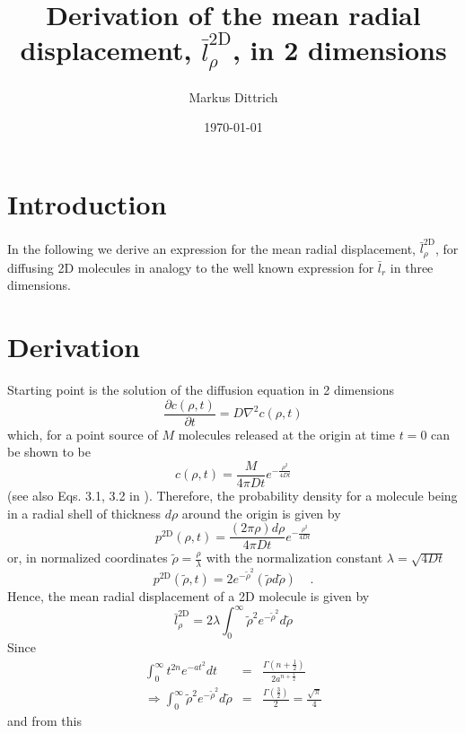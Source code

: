 \documentclass[aps,superscriptaddress,preprint,amsmath,floatfix,byrevtex]{article}
\newcommand{\lrbar}{\bar{l}_{\rho}^{\mathrm{2D}}}
\begin{document}
\title{Derivation of the mean radial displacement, $\lrbar$, in 2 dimensions}
\author{Markus Dittrich}
\date{\today}

\maketitle

\section{Introduction}
In the following we derive an expression for the mean radial displacement, $\lrbar$,
for diffusing 2D molecules in analogy to the well known expression for $\bar{l}_r$
in three dimensions. 


\section{Derivation}
Starting point is the solution of the diffusion equation in 2 dimensions
\begin{equation}
\frac{\partial c(\rho,t)}{\partial t} = D \nabla^2 c(\rho,t)
\end{equation}
which, for a point source of $M$ molecules released at the origin at time $t=0$ 
can be shown to be
\begin{equation}
c(\rho,t) = \frac{M}{4 \pi Dt} e^{- \frac{\rho^2}{4Dt}}
\end{equation}
(see also Eqs. 3.1, 3.2 in \cite{KERR2008}). Therefore, the probability
density for a molecule being in a radial shell of thickness $d\rho$ around the 
origin is given by
\begin{equation}
p^{\mathrm{2D}} (\rho,t) = \frac{(2 \pi \rho) d\rho}{4\pi Dt}  e^{- \frac{\rho^2}{4Dt}} 
\end{equation}          
or, in normalized coordinates $\tilde{\rho} = \frac{\rho}{\lambda}$ with the 
normalization constant $\lambda = \sqrt{4Dt}$
\begin{equation}
p^{\mathrm{2D}} (\tilde{\rho},t) = 2 e^{-\tilde{\rho}^2} (\tilde{\rho} d\tilde{\rho})
  \;\;\;\; .
\end{equation}
Hence, the mean radial displacement of a 2D molecule is given by
\begin{equation}
\lrbar = 2 \lambda \int_0^{\infty}  \tilde{\rho}^2 e^{- \tilde{\rho}^2} d\tilde{\rho}
\end{equation}
Since
\begin{eqnarray}
\int_0^{\infty} t^{2n} e^{-at^2} dt &=& \frac{\Gamma(n+\frac{1}{2})}{2a^{n+\frac{1}{2}}} 
  \nonumber \\
\Rightarrow \int_0^{\infty}  \tilde{\rho}^2 e^{- \tilde{\rho}^2} d\tilde{\rho} &=& 
  \frac{\Gamma(\frac{3}{2})}{2} = \frac{\sqrt{\pi}}{4} 
\end{eqnarray}
and from this
\end{document}
